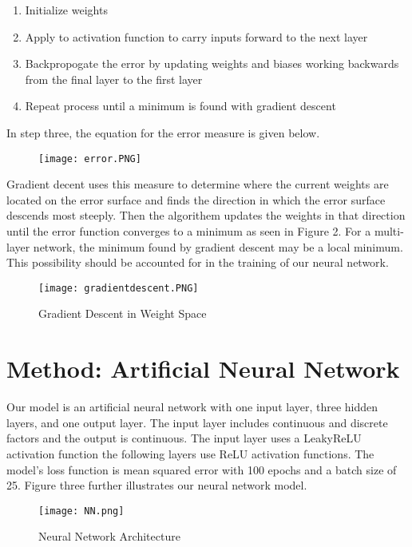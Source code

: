 \documentclass[twoside,11pt]{article}
\begin{document}
\begin{enumerate}
  \item Initialize weights
  \item Apply to activation function to carry inputs forward to the next layer
  \item Backpropogate the error by updating weights and biases working backwards from the final layer to the first layer
  \item Repeat process until a minimum is found with gradient descent
\end{enumerate}

In step three, the equation for the error measure is given below. 
\begin{figure}[h]
  \centering
  \texttt{[image: error.PNG]} 
  \label{fig:example}
\end{figure}
Gradient decent uses this measure to determine where the current weights are located on the error surface and finds the direction in which the error surface descends most steeply. Then the algorithem updates the weights in that direction until the error function converges to a minimum as seen in Figure 2. For a multi-layer network, the minimum found by gradient descent may be a local minimum. This possibility should be accounted for in the training of our neural network. 
\begin{figure}[!h]
  \centering
  \texttt{[image: gradientdescent.PNG]} 
  \caption{Gradient Descent in Weight Space}
  \label{fig:example}
\end{figure}
\FloatBarrier

\section{Method: Artificial Neural Network}
\label{model}
Our model is an artificial neural network with one input layer, three hidden layers, and one output layer. The input layer includes continuous and discrete factors and the output is continuous. The input layer uses a LeakyReLU activation function the following layers use ReLU activation functions. The model's loss function is mean squared error with 100 epochs and a batch size of 25. Figure three further illustrates our neural network model. 

\begin{figure}[htbp]
  \centering 
  \texttt{[image: NN.png]} 
  \caption{Neural Network Architecture} 
  \label{fig:example} 
\end{figure}
\end{document}
